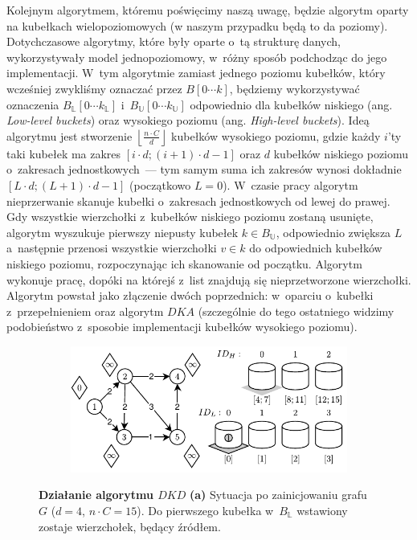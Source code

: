 Kolejnym algorytmem, któremu poświęcimy naszą uwagę, będzie algorytm oparty na kubełkach wielopoziomowych (w naszym przypadku będą to da poziomy). Dotychczasowe algorytmy, które były oparte o~tą strukturę danych, wykorzystywały model jednopoziomowy, w~różny sposób podchodząc do jego implementacji. W~tym algorytmie zamiast jednego poziomu kubełków, który wcześniej zwykliśmy oznaczać przez $B \left[ 0 \cdots k \right]$, będziemy wykorzystywać oznaczenia $B_{\mathbb{L}} \left[ 0 \cdots k_{\mathbb{L}} \right]$ i~$B_{\mathbb{U}} \left[ 0 \cdots k_{\mathbb{U}} \right]$ odpowiednio dla kubełków niskiego (ang. \textit{Low-level buckets}) oraz wysokiego poziomu (ang. \textit{High-level buckets}). Ideą algorytmu jest stworzenie $ \left \lfloor \frac{n \cdot C}{d} \right \rfloor $ kubełków wysokiego poziomu, gdzie każdy $i$'ty taki kubełek ma zakres $ \left[ i \cdot d ; \left( i+1 \right) \cdot d - 1\right]$ oraz $d$ kubełków niskiego poziomu o~zakresach jednostkowych~--- tym samym suma ich zakresów wynosi dokładnie $ \left[ L \cdot d ; \left( L+1 \right) \cdot d - 1\right]$ (początkowo $L=0$). W~czasie pracy algorytm nieprzerwanie skanuje kubełki o~zakresach jednostkowych od lewej do prawej. Gdy wszystkie wierzchołki z~kubełków niskiego poziomu zostaną usunięte, algorytm wyszukuje pierwszy niepusty kubełek $k \in B_{\mathbb{U}}$, odpowiednio zwiększa $L$ a~następnie przenosi wszystkie wierzchołki $v \in k$ do odpowiednich kubełków niskiego poziomu, rozpoczynając ich skanowanie od początku. Algorytm wykonuje pracę, dopóki na którejś z~list znajdują się nieprzetworzone wierzchołki. Algorytm powstał jako złączenie dwóch poprzednich: w~oparciu o~kubełki z~przepełnieniem oraz algorytm $DKA$ (szczególnie do tego ostatniego widzimy podobieństwo z~sposobie implementacji kubełków wysokiego poziomu).

\begin{figure}[!htbp]
	\centering
	\begin{subfigure}[b]{0.45\textwidth}
		\includegraphics[width=\textwidth]{Chapter_II/DOUBLE-LEVEL-BUCKET-Example/a.pdf}
		\caption{}
	\end{subfigure}%
	\caption{\textbf{Działanie algorytmu $DKD$} \textbf{(a)} Sytuacja po zainicjowaniu grafu $G$ ($d=4$, $n \cdot C = 15$). Do pierwszego kubełka w~$B_{\mathbb{L}}$ wstawiony zostaje wierzchołek, będący źródłem. } \label{fig:exampleDoubleLevelBuckets1}
\end{figure}
	
